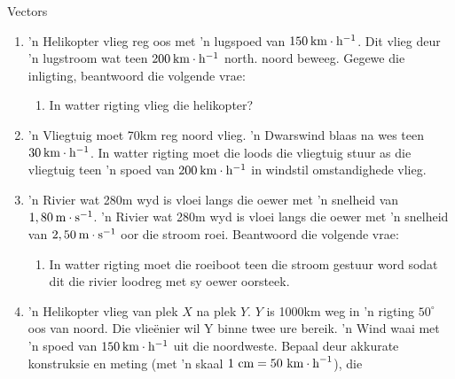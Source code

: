 \begin{eocexercises}{Vectors}
\begin{enumerate}[noitemsep, label=\textbf{\arabic*}.]
            \label{m38819*uid118}\item  'n Helikopter vlieg reg oos met  'n lugspoed van $150\phantom{\rule{2pt}{0ex}}\text{km}\ensuremath{\cdot}\text{h}{}^{-1}$. Dit vlieg deur  'n lugstroom wat teen $200\phantom{\rule{2pt}{0ex}}\text{km}\ensuremath{\cdot}\text{h}{}^{-1}$ north. noord beweeg. Gegewe die inligting, beantwoord die volgende vrae:
\label{m38819*id198203}\begin{enumerate}[noitemsep, label=\textbf{\alph*}. ] 
            \label{m38819*uid119}\item In watter rigting vlieg die helikopter?
\end{enumerate}
                \label{m38819*uid122}\item  'n Vliegtuig moet 70km reg noord vlieg.  'n Dwarswind blaas na wes teen $30\phantom{\rule{2pt}{0ex}}\text{km}\ensuremath{\cdot}\text{h}{}^{-1}$. In watter rigting moet die loods die vliegtuig stuur as die vliegtuig teen  'n spoed van $200\phantom{\rule{2pt}{0ex}}\text{km}\ensuremath{\cdot}\text{h}{}^{-1}$ in windstil omstandighede vlieg.
\label{m38819*uid123}\item  'n Rivier wat 280m wyd is vloei langs die oewer met  'n snelheid van $1,80\phantom{\rule{2pt}{0ex}}\text{m}\ensuremath{\cdot}\text{s}{}^{-1}$.  'n Rivier wat 280m wyd is vloei langs die oewer met  'n snelheid van $2,50\phantom{\rule{2pt}{0ex}}\text{m}\ensuremath{\cdot}\text{s}{}^{-1}$ oor die stroom roei. Beantwoord die volgende vrae:
\label{m38819*id198337}\begin{enumerate}[noitemsep, label=\textbf{\alph*}. ] 
\label{m38819*uid126}\item In watter rigting moet die roeiboot teen die stroom gestuur word sodat dit die rivier loodreg met sy oewer oorsteek.
\end{enumerate}
                \label{m38819*uid128}\item  'n Helikopter vlieg van plek $X$ na plek $Y$. $Y$ is 1000km weg in  'n rigting ${50}^{\circ }$ oos van noord. Die vlieënier wil Y binne twee ure bereik.  'n Wind waai met  'n spoed van $150\phantom{\rule{2pt}{0ex}}\text{km}\ensuremath{\cdot}\text{h}{}^{-1}$ uit die noordweste. Bepaal deur akkurate konstruksie en meting (met  'n skaal  $1\phantom{\rule{3.33333pt}{0ex}}\text{cm}=50\phantom{\rule{3.33333pt}{0ex}}{\text{km}\ensuremath{\cdot}\text{h}}^{-1}$), die

\end{enumerate}
\end{eocexercises}
